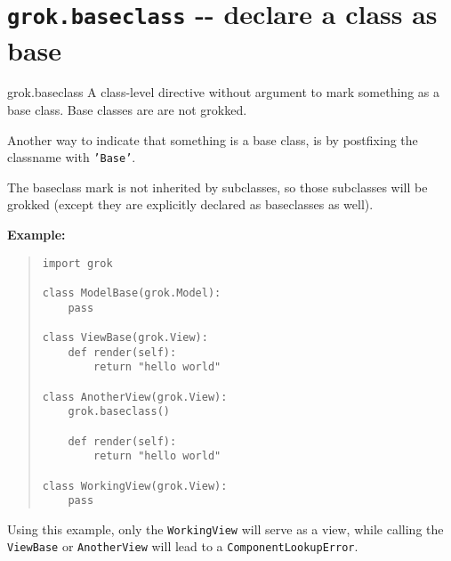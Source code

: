 \documentclass[10pt,a4paper,english]{manual}
\begin{document}

\section{\texttt{grok.baseclass} -{}- declare a class as base}
\begin{funcdesc}{grok.baseclass}{}
A class-level directive without argument to mark something as a
base class. Base classes are are not grokked.

Another way to indicate that something is a base class, is by
postfixing the classname with \texttt{'Base'}.

The baseclass mark is not inherited by subclasses, so those
subclasses will be grokked (except they are explicitly declared as
baseclasses as well).

\textbf{Example:}
\begin{quote}\begin{verbatim}
import grok

class ModelBase(grok.Model):
    pass

class ViewBase(grok.View):
    def render(self):
        return "hello world"

class AnotherView(grok.View):
    grok.baseclass()

    def render(self):
        return "hello world"

class WorkingView(grok.View):
    pass
\end{verbatim}\end{quote}

Using this example, only the \texttt{WorkingView} will serve as a
view, while calling the \texttt{ViewBase} or \texttt{AnotherView}
will lead to a \texttt{ComponentLookupError}.
\end{funcdesc}


\end{document}
